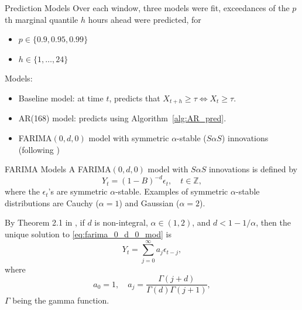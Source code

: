 \documentclass{beamer}
\def\Z{{\mathbb Z}}
\begin{document}
\begin{frame}{Prediction Models}
    Over each window, three models were fit, exceedances of the $p$th marginal quantile $h$ hours ahead were predicted, for
    \begin{itemize}
        \item $p \in \{0.9, 0.95, 0.99\}$
        \item $h \in \{1, \ldots, 24\}$
    \end{itemize}
    Models:
    \begin{itemize}
        \item Baseline model: at time $t$, predicts that $X_{t + h} \ge \tau \iff X_t \ge \tau$.
        \item AR(168) model: predicts using Algorithm~\ref{alg:AR_pred}.
        \item FARIMA$(0, d, 0)$ model with symmetric $\alpha$-stable ($S\alpha S$) innovations (following \cite{stanislavsky2009fari})
    \end{itemize}
\end{frame}

\begin{frame}{FARIMA Models}
    A FARIMA$(0, d, 0)$ model with $S\alpha S$ innovations is defined by
    \begin{equation}\label{eq:farima_0_d_0_mod}
        Y_t = (1 - B)^{-d}\epsilon_t, \quad t \in \Z,
    \end{equation}
    where the $\epsilon_t$'s are symmetric $\alpha$-stable. Examples of symmetric $\alpha$-stable distributions are Cauchy ($\alpha = 1$) and Gaussian ($\alpha = 2$).
    
    By Theorem 2.1 in \cite{kokoszka1995frac}, if $d$ is non-integral, $\alpha \in (1, 2)$, and $d < 1 - 1 / \alpha$, then the unique solution to \eqref{eq:farima_0_d_0_mod} is
    \begin{equation}\label{eq:farima_solution}
        Y_t = \sum_{j = 0}^{\infty} a_j\epsilon_{t - j},
    \end{equation}
    where
    \begin{equation}\label{eq:farima_causal_coefs}
        a_0 = 1, \quad a_j = \frac{\Gamma(j + d)}{\Gamma(d)\Gamma(j + 1)},
    \end{equation}
    $\Gamma$ being the gamma function.    
\end{frame}
\end{document}
